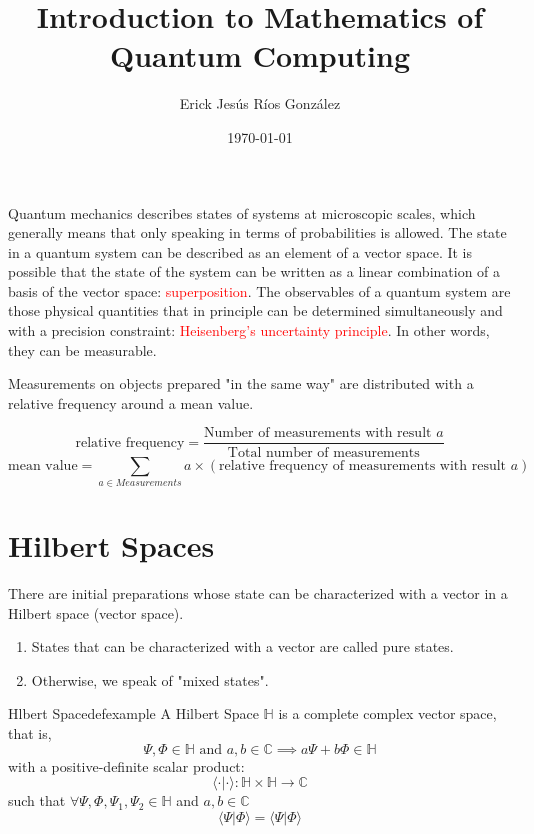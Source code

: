 \documentclass{article}
\title{Introduction to Mathematics of Quantum Computing}
\author{Erick Jesús Ríos González}
\date{\today}
\begin{document}
\maketitle
\noindent Quantum mechanics describes states of systems
at microscopic scales, which generally means that only
speaking in terms of probabilities is allowed.
The state in a quantum system can be described as an
element of a vector space.
It is possible that the state of the system can be written as
a linear combination of a basis of the vector space: \textcolor{red}{superposition}.
The observables of a quantum system are those physical quantities that
in principle can be determined simultaneously and with a precision constraint:
\textcolor{red}{Heisenberg's uncertainty principle}. In other words, they can be measurable.

Measurements on objects prepared "in the same way" are
distributed with a relative frequency around a mean value.

\begin{equation*}
    \text{relative frequency} = \dfrac{\text{Number of measurements with result }a}{\text{Total number of measurements}}
\end{equation*}
\begin{equation*}
    \text{mean value} = \sum_{a\in Measurements} a\times (\text{relative frequency of measurements with result } a)
\end{equation*}
\section{Hilbert Spaces}
There are initial preparations whose state can be characterized with a vector
in a Hilbert space (vector space).
\begin{enumerate}
    \item States that can be characterized with a vector are called
    pure states.
    \item Otherwise, we speak of "mixed states".
\end{enumerate}
\begin{mydef}{Hlbert Space}{defexample}
    A Hilbert Space $\mathbb{H}$ is a complete complex vector space, that is,
    \begin{equation}
        \Psi,\Phi \in \mathbb{H} \text{ and } a,b \in \mathbb{C} \implies a\Psi+b\Phi \in \mathbb{H}
    \end{equation}
    with a positive-definite scalar product:
    \begin{equation}
        \langle\cdot|\cdot\rangle: \mathbb{H}\times\mathbb{H}\to \mathbb{C}
    \end{equation}
    such that $\forall \Psi,\Phi, \Psi_1, \Psi_2 \in \mathbb{H}$ and $a,b \in \mathbb{C}$
    \begin{equation*}
        \langle\Psi|\Phi\rangle = {\langle\Psi|\Phi\rangle}
    \end{equation*}
\end{mydef}
\end{document}
